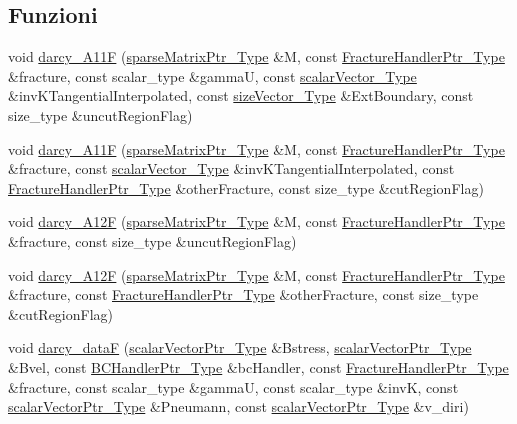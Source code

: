 \subsection*{Funzioni}
\begin{DoxyCompactItemize}
\item 
void \hyperlink{namespacegetfem_aba6f1b4f1d395aae3d96071cad4953a2}{darcy\-\_\-\-A11\-F} (\hyperlink{Core_8h_a87137a9501b38c724ac80bc955164bb7}{sparse\-Matrix\-Ptr\-\_\-\-Type} \&M, const \hyperlink{FractureHandler_8h_af23fb7a30aaff864bd42587af4f1e78a}{Fracture\-Handler\-Ptr\-\_\-\-Type} \&fracture, const scalar\-\_\-type \&gamma\-U, const \hyperlink{Core_8h_a4e75b5863535ba1dd79942de2846eff0}{scalar\-Vector\-\_\-\-Type} \&inv\-K\-Tangential\-Interpolated, const \hyperlink{Core_8h_a83c51913d041a5001e8683434c09857f}{size\-Vector\-\_\-\-Type} \&Ext\-Boundary, const size\-\_\-type \&uncut\-Region\-Flag)
\item 
void \hyperlink{namespacegetfem_a893a8f2198da73d01d77d57a5934573f}{darcy\-\_\-\-A11\-F} (\hyperlink{Core_8h_a87137a9501b38c724ac80bc955164bb7}{sparse\-Matrix\-Ptr\-\_\-\-Type} \&M, const \hyperlink{FractureHandler_8h_af23fb7a30aaff864bd42587af4f1e78a}{Fracture\-Handler\-Ptr\-\_\-\-Type} \&fracture, const \hyperlink{Core_8h_a4e75b5863535ba1dd79942de2846eff0}{scalar\-Vector\-\_\-\-Type} \&inv\-K\-Tangential\-Interpolated, const \hyperlink{FractureHandler_8h_af23fb7a30aaff864bd42587af4f1e78a}{Fracture\-Handler\-Ptr\-\_\-\-Type} \&other\-Fracture, const size\-\_\-type \&cut\-Region\-Flag)
\item 
void \hyperlink{namespacegetfem_ab62aa98cfcf55810e1518906202cbedc}{darcy\-\_\-\-A12\-F} (\hyperlink{Core_8h_a87137a9501b38c724ac80bc955164bb7}{sparse\-Matrix\-Ptr\-\_\-\-Type} \&M, const \hyperlink{FractureHandler_8h_af23fb7a30aaff864bd42587af4f1e78a}{Fracture\-Handler\-Ptr\-\_\-\-Type} \&fracture, const size\-\_\-type \&uncut\-Region\-Flag)
\item 
void \hyperlink{namespacegetfem_a3185a3e53517f728f83d30a3648096e7}{darcy\-\_\-\-A12\-F} (\hyperlink{Core_8h_a87137a9501b38c724ac80bc955164bb7}{sparse\-Matrix\-Ptr\-\_\-\-Type} \&M, const \hyperlink{FractureHandler_8h_af23fb7a30aaff864bd42587af4f1e78a}{Fracture\-Handler\-Ptr\-\_\-\-Type} \&fracture, const \hyperlink{FractureHandler_8h_af23fb7a30aaff864bd42587af4f1e78a}{Fracture\-Handler\-Ptr\-\_\-\-Type} \&other\-Fracture, const size\-\_\-type \&cut\-Region\-Flag)
\item 
void \hyperlink{namespacegetfem_ad6e90b309c01f6b4fc91c9369cba376a}{darcy\-\_\-data\-F} (\hyperlink{Core_8h_ab09b6fa3c23db1b8c60456f8690c44a7}{scalar\-Vector\-Ptr\-\_\-\-Type} \&Bstress, \hyperlink{Core_8h_ab09b6fa3c23db1b8c60456f8690c44a7}{scalar\-Vector\-Ptr\-\_\-\-Type} \&Bvel, const \hyperlink{BCHandler_8h_aa175884cb453788647f17f2230a2a762}{B\-C\-Handler\-Ptr\-\_\-\-Type} \&bc\-Handler, const \hyperlink{FractureHandler_8h_af23fb7a30aaff864bd42587af4f1e78a}{Fracture\-Handler\-Ptr\-\_\-\-Type} \&fracture, const scalar\-\_\-type \&gamma\-U, const scalar\-\_\-type \&inv\-K, const \hyperlink{Core_8h_ab09b6fa3c23db1b8c60456f8690c44a7}{scalar\-Vector\-Ptr\-\_\-\-Type} \&Pneumann, const \hyperlink{Core_8h_ab09b6fa3c23db1b8c60456f8690c44a7}{scalar\-Vector\-Ptr\-\_\-\-Type} \&v\-\_\-diri)

\end{DoxyCompactItemize}
